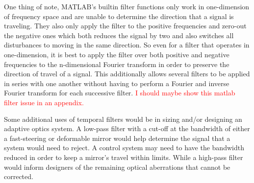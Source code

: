 One thing of note, MATLAB's builtin filter functions only work in one-dimension of frequency space and are unable to determine the direction that a signal is traveling.
They also only apply the filter to the positive frequencies and zero-out the negative ones which both reduces the signal by two and also switches all disturbances to moving in the same direction.
So even for a filter that operates in one-dimension, it is best to apply the filter over both positive and negative frequencies to the n-dimensional Fourier transform in order to preserve the direction of travel of a signal.
This additionally allows several filters to be applied in series with one another without having to perform a Fourier and inverse Fourier transform for each successive filter.
\textcolor{red}{I should maybe show this matlab filter issue in an appendix.}

Some additional uses of temporal filters would be in sizing and/or designing an adaptive optics system.
A low-pass filter with a cut-off at the bandwidth of either a fast-steering or deformable mirror would help determine the signal that a system would need to reject.
A control system may need to have the bandwidth reduced in order to keep a mirror's travel within limits.
While a high-pass filter would inform designers of the remaining optical aberrations that cannot be corrected.




